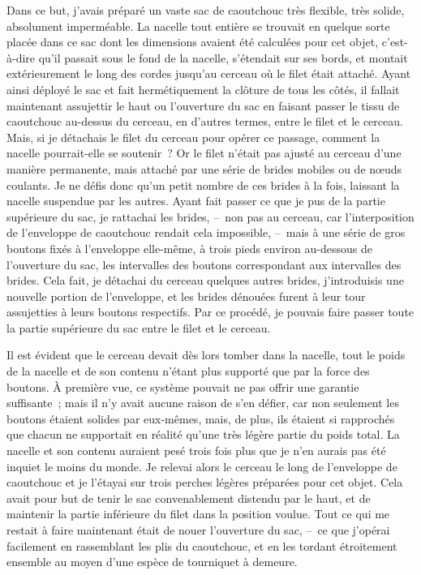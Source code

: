 \documentclass[french,twoside]{book} %
\begin{document}
Dans ce but, j’avais préparé un vaste sac de caoutchouc très flexible, très solide, absolument imperméable. La nacelle tout entière se trouvait en quelque sorte placée dans ce sac dont les dimensions avaient été calculées pour cet objet, c’est-à-dire qu’il passait sous le fond de la nacelle, s’étendait sur ses bords, et montait extérieurement le long des cordes jusqu’au cerceau où le filet était attaché. Ayant ainsi déployé le sac et fait hermétiquement la clôture de tous les côtés, il fallait maintenant assujettir le haut ou l’ouverture du sac en faisant passer le tissu de caoutchouc au-dessus du cerceau, en d’autres termes, entre le filet et le cerceau. Mais, si je détachais le filet du cerceau pour opérer ce passage, comment la nacelle pourrait-elle se soutenir ? Or le filet n’était pas ajusté au cerceau d’une manière permanente, mais attaché par une série de brides mobiles ou de nœuds coulants. Je ne défis donc qu’un petit nombre de ces brides à la fois, laissant la nacelle suspendue par les autres. Ayant fait passer ce que je pus de la partie supérieure du sac, je rattachai les brides, – non pas au cerceau, car l’interposition de l’enveloppe de caoutchouc rendait cela impossible, – mais à une série de gros boutons fixés à l’enveloppe elle-même, à trois pieds environ au-dessous de l’ouverture du sac, les intervalles des boutons correspondant aux intervalles des brides. Cela fait, je détachai du cerceau quelques autres brides, j’introduisis une nouvelle portion de l’enveloppe, et les brides dénouées furent à leur tour assujetties à leurs boutons respectifs. Par ce procédé, je pouvais faire passer toute la partie supérieure du sac entre le filet et le cerceau.\par
Il est évident que le cerceau devait dès lors tomber dans la nacelle, tout le poids de la nacelle et de son contenu n’étant plus supporté que par la force des boutons. À première vue, ce système pouvait ne pas offrir une garantie suffisante ; mais il n’y avait aucune raison de s’en défier, car non seulement les boutons étaient solides par eux-mêmes, mais, de plus, ils étaient si rapprochés que chacun ne supportait en réalité qu’une très légère partie du poids total. La nacelle et son contenu auraient pesé trois fois plus que je n’en aurais pas été inquiet le moins du monde. Je relevai alors le cerceau le long de l’enveloppe de caoutchouc et je l’étayai sur trois perches légères préparées pour cet objet. Cela avait pour but de tenir le sac convenablement distendu par le haut, et de maintenir la partie inférieure du filet dans la position voulue. Tout ce qui me restait à faire maintenant était de nouer l’ouverture du sac, – ce que j’opérai facilement en rassemblant les plis du caoutchouc, et en les tordant étroitement ensemble au moyen d’une espèce de tourniquet à demeure.\par
\end{document}
